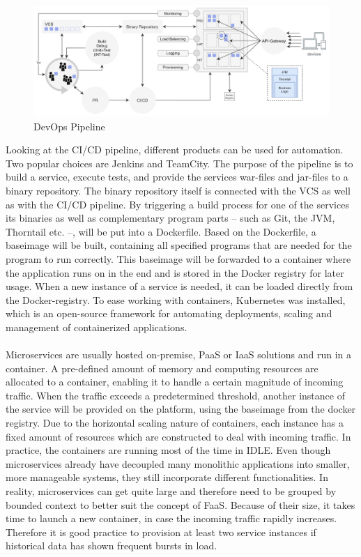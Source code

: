 \documentclass[a4paper,twoside,11pt, pagesize]{scrartcl}
\begin{document}
\begin{figure}[H]
\caption{DevOps Pipeline}
\label{fig:devopsone}
\centering
\includegraphics[width=1\textwidth]{devopsone}
\end{figure}
Looking at the CI/CD pipeline, different products can be used for automation. Two popular choices are Jenkins and TeamCity. The purpose of the pipeline is to build a service, execute tests, and provide the services war-files and jar-files to a binary repository. The binary repository itself is connected with the VCS as well as with the CI/CD pipeline. By triggering a build process for one of the services its binaries as well as complementary program parts -- such as Git, the JVM, Thorntail etc. --, will be put into a Dockerfile. Based on the Dockerfile, a baseimage will be built, containing all specified programs that are needed for the program to run correctly. This baseimage will be forwarded to a container where the application runs on in the end and is stored in the Docker registry for later usage. When a new instance of a service is needed, it can be loaded directly from the Docker-registry. To ease working with containers, Kubernetes was installed, which is an open-source framework for automating deployments, scaling and management of containerized applications.\\\\ Microservices are usually hosted on-premise, PaaS or IaaS solutions and run in a container. A pre-defined amount of memory and computing resources are allocated to a container, enabling it to handle a certain magnitude of incoming traffic. When the traffic exceeds a predetermined threshold, another instance of the service will be provided on the platform, using the baseimage from the docker registry. Due to the horizontal scaling nature of containers, each instance has a fixed amount of resources which are constructed to deal with incoming traffic.  In practice, the containers are running most of the time in IDLE. Even though microservices already have decoupled many monolithic applications into smaller, more manageable systems, they still incorporate different functionalities. In reality, microservices can get quite large and therefore need to be grouped by bounded context to better suit the concept of FaaS. Because of their size, it takes time to launch a new container, in case the incoming traffic rapidly increases. Therefore it is good practice to provision at least two service instances if historical data has shown frequent bursts in load. 
\end{document}
